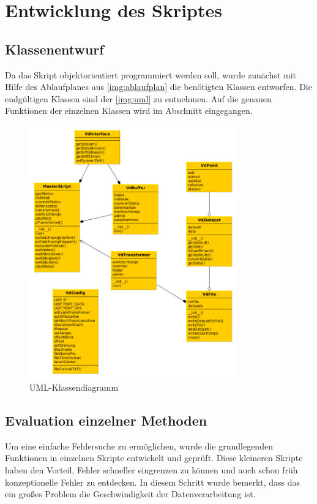 \documentclass[a4paper,12pt,bibliography=totoc, listof=totoc,titlepage,pointlessnumbers]{scrreprt}
\begin{document}
\chapter{Entwicklung des Skriptes}
\label{c:skript}

\section{Klassenentwurf}
Da das Skript objektorientiert programmiert werden soll, wurde zunächst mit Hilfe des Ablaufplanes aus \autoref{img:ablaufplan} die benötigten Klassen entworfen. Die endgültigen Klassen sind der \autoref{img:uml} zu entnehmen. Auf die genauen Funktionen der einzelnen Klassen wird im Abschnitt  eingegangen.

\begin{figure}[ht!]
 \centering
 \includegraphics[width=0.8\textwidth]{./img/UML.png}
 \caption{UML-Klassendiagramm}
 \label{img:uml}
\end{figure}

\section{Evaluation einzelner Methoden}
Um eine einfache Fehlersuche zu ermöglichen, wurde die grundlegenden Funktionen in einzelnen Skripte entwickelt und geprüft. Diese kleineren Skripte haben den Vorteil, Fehler schneller eingrenzen zu können und auch schon früh konzeptionelle Fehler zu entdecken. In diesem Schritt wurde bemerkt, dass das ein großes Problem die Geschwindigkeit der Datenverarbeitung ist. 
\end{document}
